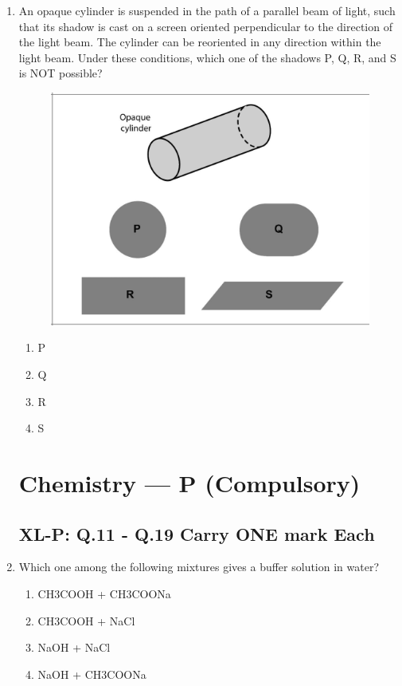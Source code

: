 \documentclass[journal,12pt,onecolumn]{IEEEtran}
\begin{document}
\begin{enumerate}
    \item An opaque cylinder is suspended in the path of a parallel beam of light, such that its shadow is cast on a screen oriented perpendicular to the direction of the light beam. The cylinder can be reoriented in any direction within the light beam. Under these conditions, which one of the shadows P, Q, R, and S is NOT possible?\\
\begin{figure}[H]
		\centering
	\includegraphics[scale=0.5]{10}
		    \caption*{}
		\label{fig:Q10}
	\end{figure}
    \begin{enumerate}
        \item P
        \item Q
        \item R
        \item S
    \end{enumerate}

\section*{Chemistry --- P (Compulsory)}
\subsection*{XL-P: Q.11 - Q.19 Carry ONE mark Each}

    \item Which one among the following mixtures gives a buffer solution in water?
    \begin{enumerate}
        \item CH3COOH + CH3COONa
        \item CH3COOH + NaCl
        \item NaOH + NaCl
        \item NaOH + CH3COONa
    \end{enumerate}


\end{enumerate}
\end{document}
